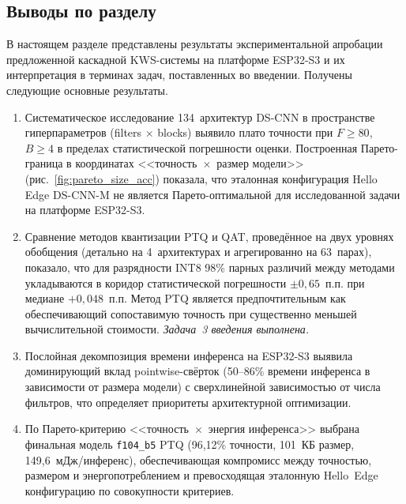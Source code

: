 \subsection{Выводы по разделу}

В настоящем разделе представлены результаты экспериментальной
апробации предложенной каскадной KWS-системы на платформе
ESP32-S3 и их интерпретация в терминах задач, поставленных во
введении. Получены следующие основные результаты.

\begin{enumerate}
	\item Систематическое исследование 134~архитектур DS-CNN в
	      пространстве гиперпараметров (filters $\times$ blocks)
	      выявило плато точности при $F \geq 80$, $B \geq 4$ в
	      пределах статистической погрешности оценки.
	      Построенная Парето-граница в координатах
	      <<точность~$\times$~размер модели>>
	      (рис.~\ref{fig:pareto_size_acc}) показала, что
	      эталонная конфигурация Hello Edge DS-CNN-M не является
	      Парето-оптимальной для исследованной задачи на
	      платформе ESP32-S3.

	\item Сравнение методов квантизации PTQ и QAT, проведённое
	      на двух уровнях обобщения (детально на 4~архитектурах и
	      агрегированно на 63~парах), показало, что для
	      разрядности INT8 98\% парных различий между методами
	      укладываются в коридор статистической погрешности
	      $\pm 0{,}65$~п.п. при медиане $+0{,}048$~п.п. Метод PTQ
	      является предпочтительным как обеспечивающий
	      сопоставимую точность при существенно меньшей
	      вычислительной стоимости. \textit{Задача~3 введения
		      выполнена.}

	\item Послойная декомпозиция времени инференса на ESP32-S3
	      выявила доминирующий вклад pointwise-свёрток
	      (50--86\% времени инференса в зависимости от размера
	      модели) с сверхлинейной зависимостью от числа
	      фильтров, что определяет приоритеты архитектурной
	      оптимизации.

	\item По Парето-критерию <<точность~$\times$~энергия
	      инференса>> выбрана финальная модель \texttt{f104\_b5}
	      PTQ (96,12\% точности, 101~КБ размер, 149,6~мДж/инференс),
	      обеспечивающая компромисс между точностью, размером и
	      энергопотреблением и превосходящая эталонную
	      Hello~Edge конфигурацию по совокупности критериев.


\end{enumerate}
